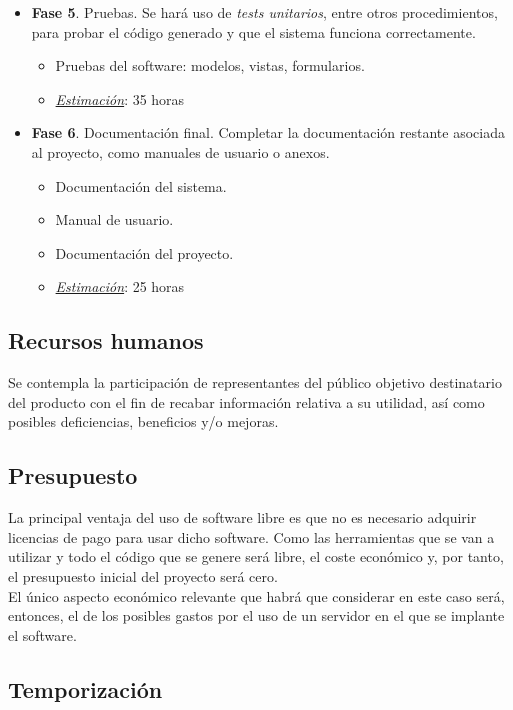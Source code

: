 \begin{itemize}
	\item \textbf{Fase 5}. Pruebas. Se hará uso de \textit{tests unitarios}, entre otros procedimientos, para probar el código generado y que el sistema funciona correctamente.
	\begin{itemize}
		\item Pruebas del software: modelos, vistas, formularios.
		\item \underline{\textit{Estimación}}: 35 horas
	\end{itemize}
	
	\item \textbf{Fase 6}. Documentación final. Completar la documentación restante asociada al proyecto, como manuales de usuario o anexos.
	\begin{itemize}
		\item Documentación del sistema.
		\item Manual de usuario.
		\item Documentación del proyecto.
		\item \underline{\textit{Estimación}}: 25 horas
	\end{itemize}
\end{itemize}

\subsection{Recursos humanos}

Se contempla la participación de representantes del público objetivo destinatario del producto con el fin de recabar información relativa a su utilidad, así como posibles deficiencias, beneficios y/o mejoras.

\subsection{Presupuesto}

La principal ventaja del uso de software libre es que no es necesario adquirir licencias de pago para usar dicho software. Como las herramientas que se van a utilizar y todo el código que se genere será libre, el coste económico y, por tanto, el presupuesto inicial del proyecto será cero.\\

El único aspecto económico relevante que habrá que considerar en este caso será, entonces, el de los posibles gastos por el uso de un servidor en el que se implante el software.

\subsection{Temporización}

